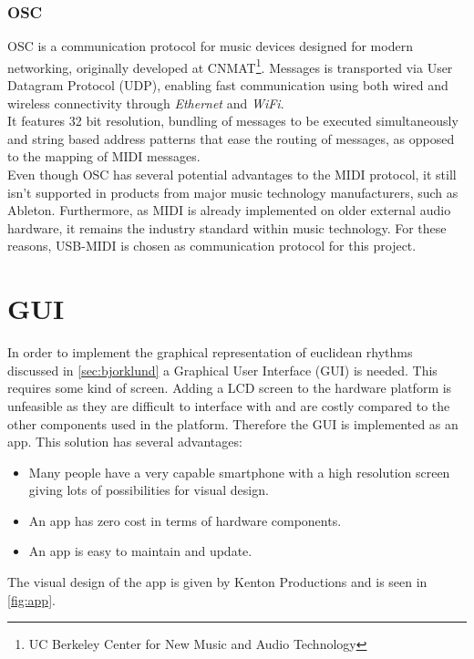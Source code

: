 \subsubsection{OSC}
OSC is a communication protocol for music devices designed for modern networking, originally developed at CNMAT\footnote{UC Berkeley Center for New Music and Audio Technology}. Messages is transported via User Datagram Protocol (UDP), enabling fast communication using both wired and wireless connectivity through \textit{Ethernet} and \textit{WiFi}.\\
It features 32 bit resolution, bundling of messages to be executed simultaneously and string based address patterns that ease the routing of messages, as opposed to the mapping of MIDI messages.\\ 

Even though OSC has several potential advantages to the MIDI protocol, it still isn't supported in products from major music technology manufacturers, such as Ableton. Furthermore, as MIDI is already implemented on older external audio hardware, it remains the industry standard within music technology. For these reasons, USB-MIDI is chosen as communication protocol for this project.


\section{GUI}
In order to implement the graphical representation of euclidean rhythms discussed in \cref{sec:bjorklund} a Graphical User Interface (GUI) is needed. This requires some kind of screen. Adding a LCD screen to the hardware platform is unfeasible as they are difficult to interface with and are costly compared to the other components used in the platform. Therefore the GUI is implemented as an app. This solution has several advantages:
\begin{itemize}
    \item Many people have a very capable smartphone with a high resolution screen giving lots of possibilities for visual design.
    \item An app has zero cost in terms of hardware components.
    \item An app is easy to maintain and update.
\end{itemize}

The visual design of the app is given by Kenton Productions and is seen in \cref{fig:app}.

